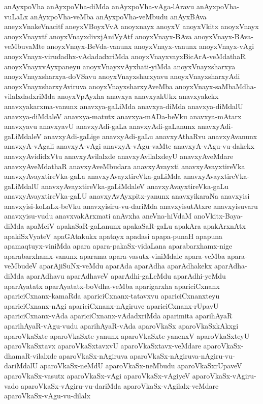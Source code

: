 {anAyxpoVha
anAyxpoVha-diMda
anAyxpoVha-vAga-lAravu
anAyxpoVha-vuLaLx
anAyxpoVha-veMba
anAyxpoVha-veMbudu
anAyxBAva
aneyxVnakeVnacitf
aneyxVBoyxVvA
anoyxnayx
anoyxV
anoyxVkitx
anoyxVnayx
anoyxVnayxtf
anoyxVnayxdivxjAniVyAtf
anoyxVnayx-BAva
anoyxVnayx-BAva-veMbuvaMte
anoyxVnayx-BeVda-vanunx
anoyxVnayx-vanunx
anoyxVnayx-vAgi
anoyxVnayx-virudadhx-vAdadadxriMda
anoyxVnayxvayxBicArA-veMdathaR
anoyxVnayxvAyxpaneyu
anoyxVnayxvAyxhati-yiMda
anoyxVnayxsharxya
anoyxVnayxsharxya-doVSavu
anoyxVnayxsharxyavu
anoyxVnayxsharxyAdi
anoyxVnayxsharxyAviruva
anoyxVnayxsharxyAveMba
anoyxVnayx-saMbaMdha-vilalxdadxriMda
anoyxVpAyxha
anavxya
anavxyakUkx
anavxyakekx
anavxyakarxma-vanunx
anavxya-gaLiMda
anavxya-diMda
anavxya-diMdalU
anavxya-diMdaleV
anavxya-matutx
anavxya-mADa-beVku
anavxya-mAtarx
anavxyavu
anavxyavU
anavxyAdi-gaLa
anavxyAdi-gaLanunx
anavxyAdi-gaLiMdaleV
anavxyAdi-gaLige
anavxyAdi-gaLu
anavxyAthaRvu
anavxyAvanunx
anavxyA-vAgali
anavxyA-vAgi
anavxyA-vAgu-vaMte
anavxyA-vAgu-vu-dakekx
anavxyAvididxVtu
anavxyAvilalxde
anavxyAvilalxdeyU
anavxyAveMdare
anavxyAveMdathaR
anavxyAveMbudara
anavxyAvayxti
anavxyAvayxtireVka
anavxyAvayxtireVka-gaLa
anavxyAvayxtireVka-gaLiMda
anavxyAvayxtireVka-gaLiMdalU
anavxyAvayxtireVka-gaLiMdaleV
anavxyAvayxtireVka-gaLu
anavxyAvayxtireVka-gaLU
anavxyAvAyxpitx-yanunx
anavxyikaraNa
anavxyisi
anavxyisi-koLaLx-beVku
anavxyisiru-vu-dariMda
anavxyisutAtxre
anavxyisuvaru
anavxyisu-vudu
anavxvakArxmati
anAvxha
aneVna-hiVdaM
anoVkitx-Baya-diMda
apaMciV
apakaSaR-gaLanunx
apakaSaR-gaLu
apakAra
apakArxnAtx
apakiSxVyateV
apaGAtakukx
apatayx
apadasi
apapa-punaH
apapuna
apamaqtuyx-viniMda
apara
apara-pakaSx-vidaLana
aparabarxhamx-nige
aparabarxhamx-vanunx
aparama
apara-vasutx-viniMdale
apara-veMba
apara-veMbudeV
aparAjiSuNx-veMdu
aparAda
aparAdha
aparAdhakekx
aparAdha-diMda
aparAdhavu
aparAdhaveV
aparAdhi-gaLeMdu
aparAdhi-yeMdu
aparAyatatx
aparAyatatx-boVdha-veMba
aparigarxha
apariciCxnanx
apariciCxnanx-kamaRda
apariciCxnanx-tatavxvu
apariciCxnanxteyu
apariciCxnanx-nAgi
apariciCxnanx-nAgiruve
apariciCxnanx-rUpavU
apariciCxnanx-vAda
apariciCxnanx-vAdadxriMda
aparimita
aparihAyaR
aparihAyaR-vAgu-vudu
aparihAyaR-vAda
aparoVkaSx
aparoVkaSxkAkxgi
aparoVkaSxte
aparoVkaSxte-yanunx
aparoVkaSxte-yanenxV
aparoVkaSxteyU
aparoVkaSxtavx
aparoVkaSxtavxvU
aparoVkaSxtavx-veMdare
aparoVkaSx-dhamaR-vilalxde
aparoVkaSx-nAgiruva
aparoVkaSx-nAgiruva-nAgiru-vu-dariMdalU
aparoVkaSx-neMdU
aparoVkaSx-neMbudu
aparoVkaSxrUpaveV
aparoVkaSx-vasutx
aparoVkaSx-vAgi
aparoVkaSx-vAgiyeV
aparoVkaSx-vAgiru-vado
aparoVkaSx-vAgiru-vu-dariMda
aparoVkaSx-vAgilalx-veMdare
aparoVkaSx-vAgu-vu-dilalx
}
